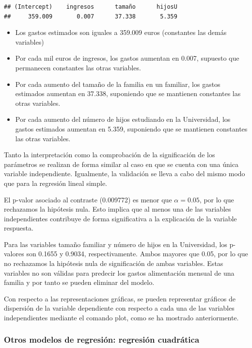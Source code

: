 \documentclass[]{book}
\providecommand{\tightlist}{%
  \setlength{\itemsep}{0pt}\setlength{\parskip}{0pt}}
\begin{document}
\begin{verbatim}
## (Intercept)    ingresos      tamaño      hijosU 
##     359.009       0.007      37.338       5.359
\end{verbatim}

\begin{itemize}
\tightlist
\item
  Los gastos estimados son iguales a 359.009 euros (constantes las demás
  variables)
\item
  Por cada mil euros de ingresos, los gastos aumentan en 0.007, supuesto
  que permanecen constantes las otras variables.
\item
  Por cada aumento del tamaño de la familia en un familiar, los gastos
  estimados aumentan en 37.338, suponiendo que se mantienen constantes
  las otras variables.
\item
  Por cada aumento del número de hijos estudiando en la Universidad, los
  gastos estimados aumentan en 5.359, suponiendo que se mantienen
  constantes las otras variables.
\end{itemize}

Tanto la interpretación como la comprobación de la significación de los
parámetros se realizan de forma similar al caso en que se cuenta con una
única variable independiente. Igualmente, la validación se lleva a cabo
del mismo modo que para la regresión lineal simple.

El p-valor asociado al contraste (0.009772) es menor que
\(\alpha = 0.05\), por lo que rechazamos la hipótesis nula. Esto implica
que al menos una de las variables independientes contribuye de forma
significativa a la explicación de la variable respuesta.

Para las variables tamaño familiar y número de hijos en la Universidad,
los p-valores son 0.1655 y 0.9034, respectivamente. Ambos mayores que
0.05, por lo que no rechazamos la hipótesis nula de significación de
ambas variables. Estas variables no son válidas para predecir los gastos
alimentación mensual de una familia y por tanto se pueden eliminar del
modelo.

Con respecto a las representaciones gráficas, se pueden representar
gráficos de dispersión de la variable dependiente con respecto a cada
una de las variables independientes mediante el comando plot, como se ha
mostrado anteriormente.

\subsubsection{Otros modelos de regresión: regresión
cuadrática}\label{otros-modelos-de-regresion-regresion-cuadratica}
\end{document}
